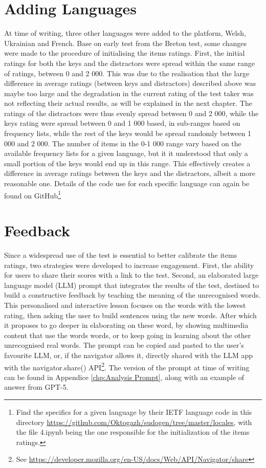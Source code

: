     \section{Adding Languages}
At time of writing, three other languages were added to the platform, Welsh, Ukrainian and French. Base on early test from the Breton test, some changes were made to the procedure of initialising the items ratings. First, the initial ratings for both the keys and the distractors were spread within the same range of ratings, between 0 and 2 000. This was due to the realisation that the large difference in average ratings (between keys and distractors) described above was maybe too large and the degradation in the current rating of the test taker was not reflecting their actual results, as will be explained in the next chapter. The ratings of the distractors were thus evenly spread between 0 and 2 000, while the keys rating were spread between 0 and 1 000 based, in sub-ranges based on frequency lists, while the rest of the keys would be spread randomly between 1 000 and 2 000. The number of items in the 0-1 000 range vary based on the available frequency lists for a given language, but it it understood that only a small portion of the keys would end up in this range. This effectively creates a difference in average ratings between the keys and the distractors, albeit a more reasonable one. Details of the code use for each specific language can again be found on GitHub\footnote{Find the specifics for a given language by their IETF language code in this directory \url{https://github.com/Oktogazh/sudogen/tree/master/locales}, with the file 4.ipynb being the one responsible for the initialization of the items ratings.}

    \section{Feedback}
Since a widespread use of the test is essential to better calibrate the items ratings, two strategies were developed to increase engagement. First, the ability for users to share their scores with a link to the test. Second, an elaborated large language model (LLM) prompt that integrates the results of the test, destined to build a constructive feedback by teaching the meaning of the unrecognised words. This personalised and interactive lesson focuses on the words with the lowest rating, then asking the user to build sentences using the new words. After which it proposes to go deeper in elaborating on these word, by showing multimedia content that use the words words, or to keep going in learning about the other unrecognised real words. The prompt can be copied and pasted to the user's favourite LLM, or, if the navigator allows it, directly shared with the LLM app with the navigator.share() API\footnote{See \url{https://developer.mozilla.org/en-US/docs/Web/API/Navigator/share}}. The version of the prompt at time of writing can be found in Appendice \ref{chp:Analysis Prompt}, along with an example of answer from GPT-5.

